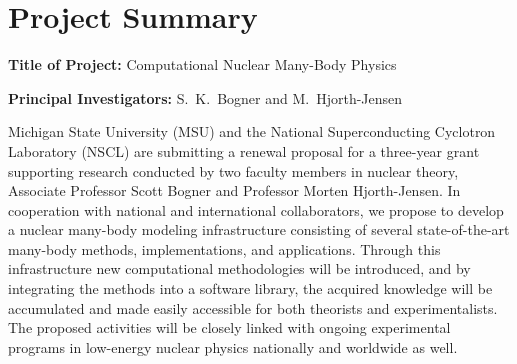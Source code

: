 

\section{Project Summary}
\label{ProjectSummary}

\noindent
{\bf Title of Project:}  Computational Nuclear Many-Body Physics

\noindent
{\bf Principal Investigators:}  
S.~K.\ Bogner and M.~Hjorth-Jensen

\medskip
Michigan State University (MSU) and the National Superconducting
Cyclotron Laboratory (NSCL) are submitting a renewal proposal for a
three-year grant supporting research conducted by two faculty members
in nuclear theory, Associate Professor Scott Bogner and Professor
Morten Hjorth-Jensen. In cooperation with national and international
collaborators, we propose to develop a nuclear many-body modeling
infrastructure consisting of several state-of-the-art many-body
methods, implementations, and applications. Through this
infrastructure new computational methodologies will be introduced, and
by integrating the methods into a software library, the acquired
knowledge will be accumulated and made easily accessible for both
theorists and experimentalists.  The proposed activities will be
closely linked with ongoing experimental programs in low-energy
nuclear physics nationally and worldwide as well.










